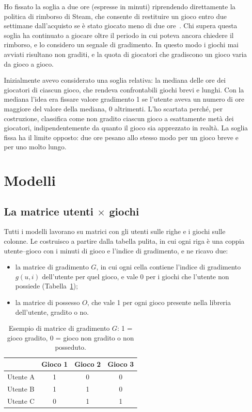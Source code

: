 \documentclass[11pt,a4paper]{article}
\begin{document}
Ho fissato la soglia a due ore (espresse in minuti) riprendendo direttamente la politica di rimborso di Steam, che
consente di restituire un gioco entro due settimane dall'acquisto se è stato
giocato meno di due ore~\cite{refund}. Chi supera questa soglia ha continuato a
giocare oltre il periodo in cui poteva ancora chiedere il rimborso, e lo
considero un segnale di gradimento. In questo modo i giochi mai avviati risultano
non graditi, e la quota di giocatori che gradiscono un gioco varia da gioco a
gioco.

Inizialmente avevo considerato una soglia relativa: la mediana delle ore dei
giocatori di ciascun gioco, che rendeva  confrontabili giochi brevi e lunghi. Con la mediana l'idea era fissare valore gradimento 1 se l'utente aveva un numero di ore maggiore del valore della mediana, 0 altrimenti. L'ho
scartata perché, per costruzione, classifica come non gradito ciascun gioco a esattamente metà dei giocatori, indipendentemente da quanto il gioco sia apprezzato in realtà. La soglia
fissa ha il limite opposto: due ore pesano allo stesso modo per un gioco breve e
per uno molto lungo.

\section{Modelli}
\label{sec:modelli}

\subsection{La matrice utenti $\times$ giochi}
\label{sec:matrici}

Tutti i modelli lavorano su matrici con gli utenti sulle righe e i giochi sulle
colonne. Le costruisco a partire dalla tabella pulita, in cui ogni riga è una
coppia utente--gioco con i minuti di gioco e l'indice di gradimento, e ne ricavo
due:
\begin{itemize}
  \item la matrice di gradimento $G$, in cui ogni cella contiene l'indice di
        gradimento $g(u,i)$ dell'utente per quel gioco, e vale 0 per i giochi
        che l'utente non possiede (Tabella~\ref{tab:matrice});
  \item la matrice di possesso $O$, che vale 1 per ogni gioco presente nella
        libreria dell'utente, gradito o no.
\end{itemize}

\begin{table}[h]
\centering
\begin{tabular}{lccc}
\toprule
 & Gioco 1 & Gioco 2 & Gioco 3 \\
\midrule
Utente A & 1 & 0 & 0 \\
Utente B & 1 & 1 & 0 \\
Utente C & 0 & 1 & 1 \\
\bottomrule
\end{tabular}
\caption{Esempio di matrice di gradimento $G$: 1 = gioco gradito, 0 =
gioco non gradito o non posseduto.}
\label{tab:matrice}
\end{table}
\end{document}
